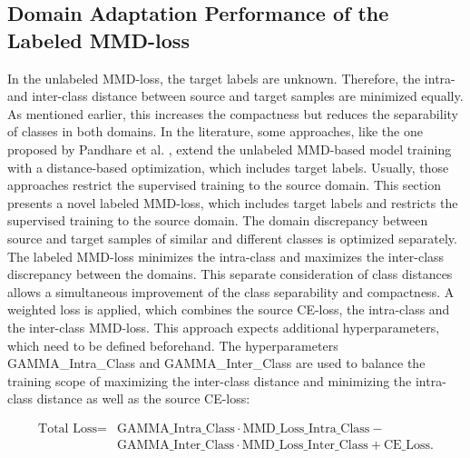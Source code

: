 \subsection{Domain Adaptation Performance of the Labeled MMD-loss} \label{sec:Differences of labeled and unlabeled MMD loss}

In the unlabeled MMD-loss, the target labels are unknown. Therefore, the intra- and inter-class distance between source and target samples are minimized equally. As mentioned earlier, this increases the compactness but reduces the separability of classes in both domains. In the literature, some approaches, like the one proposed by Pandhare et al. \cite{Pandhare2021}, extend the unlabeled MMD-based model training with a distance-based optimization, which includes target labels. Usually, those approaches restrict the supervised training to the source domain. This section presents a novel labeled MMD-loss, which includes target labels and restricts the supervised training to the source domain. The domain discrepancy between source and target samples of similar and different classes is optimized separately. The labeled MMD-loss minimizes the intra-class and maximizes the inter-class discrepancy between the domains. This separate consideration of class distances allows a simultaneous improvement of the class separability and compactness. A weighted loss is applied, which combines the source CE-loss, the intra-class and the inter-class MMD-loss. This approach expects additional hyperparameters, which need to be defined beforehand. The hyperparameters GAMMA\_Intra\_Class and GAMMA\_Inter\_Class are used to balance the training scope of maximizing the inter-class distance and minimizing the intra-class distance as well as the source CE-loss:

\begin{equation}
\begin{split}
    \mbox{Total Loss} = & \mbox{GAMMA\_Intra\_Class}  \cdot \mbox{MMD\_Loss\_Intra\_Class} - \\
                              &\mbox{GAMMA\_Inter\_Class} \cdot \mbox{MMD\_Loss\_Inter\_Class} + \mbox{CE\_Loss}.
\end{split}
\end{equation}


